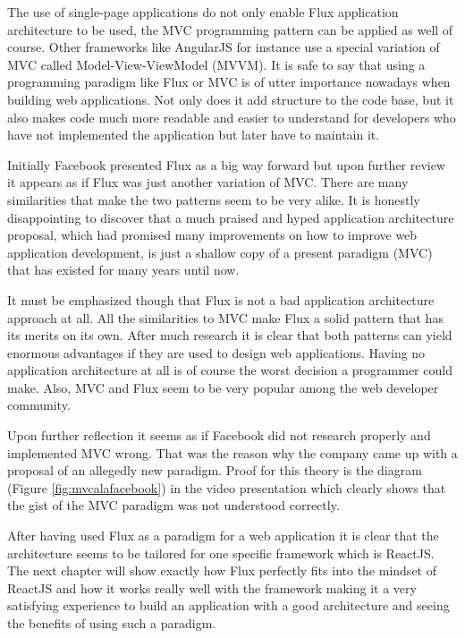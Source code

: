 The use of single-page applications do not only enable Flux application architecture to be used, the MVC programming pattern can be applied as well of course. Other frameworks like AngularJS for instance use a special variation of MVC called Model-View-ViewModel (MVVM). It is safe to say that using a programming paradigm like Flux or MVC is of utter importance nowadays when building web applications. Not only does it add structure to the code base, but it also makes code much more readable and easier to understand for developers who have not implemented the application but later have to maintain it.

Initially Facebook presented Flux as a big way forward but upon further review it appears as if Flux was just another variation of MVC. There are many similarities that make the two patterns seem to be very alike. It is honestly disappointing to discover that a much praised and hyped application architecture proposal, which had promised many improvements on how to improve web application development, is just a shallow copy of a present paradigm (MVC) that has existed for many years until now. 

It must be emphasized though that Flux is not a bad application architecture approach at all. All the similarities to MVC make Flux a solid pattern that has its merits on its own. After much research it is clear that both patterns can yield enormous advantages if they are used to design web applications. Having no application architecture at all is of course the worst decision a programmer could make. Also, MVC and Flux seem to be very popular among the web developer community.

Upon further reflection it seems as if Facebook did not research properly and implemented MVC wrong. That was the reason why the company came up with a proposal of an allegedly new paradigm. Proof for this theory is the diagram (Figure \ref{fig:mvcalafacebook}) in the video presentation \cite{youtube.2014} which clearly shows that the gist of the MVC paradigm was not understood correctly. 

After having used Flux as a paradigm for a web application it is clear that the architecture seems to be tailored for one specific framework which is ReactJS. The next chapter will show exactly how Flux perfectly fits into the mindset of ReactJS and how it works really well with the framework making it a very satisfying experience to build an application with a good architecture and seeing the benefits of using such a paradigm.

